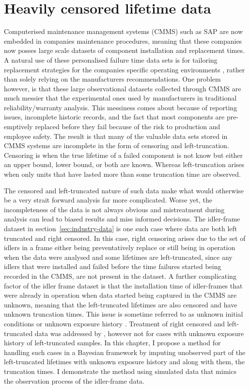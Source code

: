 \chapter{Heavily censored lifetime data} \label{chap:chapter2}

Computerised maintenance management systems (CMMS) such as SAP \citep{sap} are now embedded in companies maintenance procedures, meaning that these companies now posses large scale datasets of component installation and replacement times. A natural use of these personalised failure time data sets is for tailoring replacement strategies for the companies specific operating environments \citep[p. 13]{Meeker2022}, rather than solely relying on the manufacturers recommendations. One problem however, is that these large observational datasets collected through CMMS are much messier that the experimental ones used by manufacturers in traditional reliability/warranty analysis. This messiness comes about because of reporting issues, incomplete historic records, and the fact that most components are pre-emptively replaced before they fail because of the risk to production and employee safety. The result is that many of the valuable data sets stored in CMMS systems are incomplete in the form of censoring and left-truncation. Censoring is when the true lifetime of a failed component is not know but either an upper bound, lower bound, or both are known. Whereas left-truncation arises when only units that have lasted more than some truncation time are observed.

The censored and left-truncated nature of such data make what would otherwise be a very strait forward analysis far more complicated. Worse yet, the incompleteness of the data is not always obvious and mistreatment during analysis can lead to biased results and miss informed decisions. The idler-frame dataset in section~\ref{sec:industry-data} is one such case where data are both left truncated and right censored. In this case, right censoring arises due to the set of idlers in a frame either being preventatively replace or still being in operation when the data were analysed and some lifetimes are left-truncated, since any idlers that were installed and failed before the time failures started being recorded in the CMMS, are not present in the dataset. A further complicating factor of the idler frame dataset is that the installation time of idler-frames that were already in operation when data started being captured in the CMMS are unknown, meaning that the left-truncated lifetimes are also censored and have unknown truncation times. This issue is sometime referred to as unknown initial conditions or unknown exposure history \citep{guo1993}. Treatment of right censored and left-truncated data was addressed by \citet{hong2009}, however not for cases with unknown exposure history of left-truncated samples. In this chapter, I propose a method for handling such cases in a Bayesian framework by imputing unobserved part of the left-truncated lifetimes with unknown exposure history and along with them, the truncation times. I demonstrate the method using simulated data that mimics the observation process of the idler-frame data.

